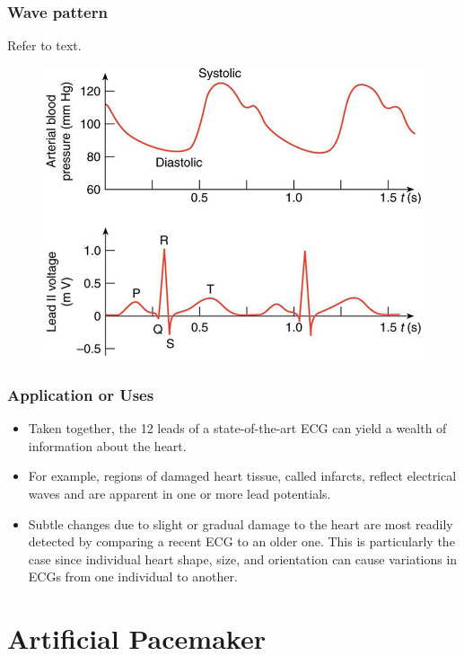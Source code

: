 \documentclass[12pt]{book}
\begin{document}
\subsubsection{Wave pattern}
Refer to text.
\begin{figure}[h]
\includegraphics{ecg.jpeg}
\end{figure}


\subsubsection{Application or Uses }
\begin{itemize}
	\item
Taken together, the 12 leads of a state-of-the-art ECG can yield a wealth of information about the heart.
\item For example, regions of damaged heart tissue, called infarcts, reflect electrical waves and are apparent in one or more lead potentials.
\item Subtle changes due to slight or gradual damage to the heart are most readily detected by comparing a recent ECG to an older one. This is particularly the case since individual heart shape, size, and orientation can cause variations in ECGs from one individual to another.
\end{itemize}

\section{Artificial Pacemaker}
\end{document}
